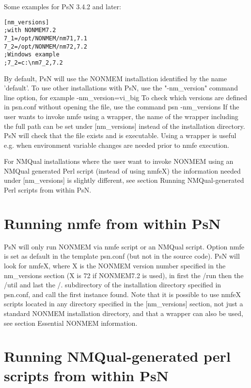 Some examples for PsN 3.4.2 and later:
\begin{verbatim}
[nm_versions]
;with NONMEM7.2 
7_1=/opt/NONMEM/nm71,7.1
7_2=/opt/NONMEM/nm72,7.2
;Windows example
;7_2=c:\nm7_2,7.2
\end{verbatim}
By default, PsN will use the NONMEM installation identified by the name 'default'. To use other installations with PsN, use the "-nm\_version" command line option, for example -nm\_version=vi\_big
To check which versions are defined in psn.conf without opening the file, use the command 
psn -nm\_versions
If the user wants to invoke nmfe using a wrapper, the name of the wrapper including the full path can be set under [nm\_versions] instead of the installation directory. PsN will check that the file exists and is executable. Using a wrapper is useful e.g. when environment variable changes are needed prior to nmfe execution.

For NMQual installations where the user want to invoke NONMEM using an NMQual generated Perl script (instead of using nmfeX) the information needed under [nm\_versions] is slightly different, see section Running NMQual-generated Perl scripts from within PsN.


\section{Running nmfe from within PsN}

PsN will only run NONMEM via nmfe script or an NMQual script. Option nmfe is set as default in the template psn.conf (but not in the source code). PsN will look for nmfeX, where X is the NONMEM version number specified in the nm\_versions section (X is 72 if NONMEM7.2 is used),  in first the /run then the  /util and last the /. subdirectory of the installation directory specified in psn.conf, and call the first instance found. Note that it is possible to use nmfeX scripts located in any directory specified in the [nm\_versions] section, not just a standard NONMEM installation directory, and that a wrapper can also be used, see section Essential NONMEM information.

\section{Running  NMQual-generated perl scripts from within PsN}

